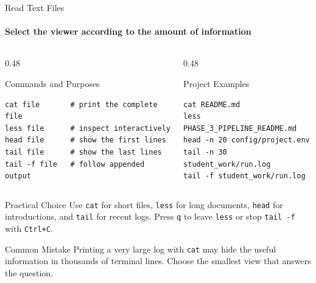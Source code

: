 \begin{frame}[fragile]{Read Text Files}
\framesubtitle{Select the viewer according to the amount of information}

\scriptsize

\begin{columns}[T,onlytextwidth]
    \begin{column}{0.48\textwidth}
        \begin{block}{Commands and Purposes}
\begin{verbatim}
cat file       # print the complete file
less file      # inspect interactively
head file      # show the first lines
tail file      # show the last lines
tail -f file   # follow appended output
\end{verbatim}
        \end{block}
    \end{column}

    \begin{column}{0.48\textwidth}
        \begin{exampleblock}{Project Examples}
\begin{verbatim}
cat README.md
less PHASE_3_PIPELINE_README.md
head -n 20 config/project.env
tail -n 30 student_work/run.log
tail -f student_work/run.log
\end{verbatim}
        \end{exampleblock}
    \end{column}
\end{columns}

\begin{block}{Practical Choice}
Use \texttt{cat} for short files, \texttt{less} for long documents,
\texttt{head} for introductions, and \texttt{tail} for recent logs.
Press \texttt{q} to leave \texttt{less} or stop \texttt{tail -f} with
\texttt{Ctrl+C}.
\end{block}

\begin{alertblock}{Common Mistake}
Printing a very large log with \texttt{cat} may hide the useful information in
thousands of terminal lines. Choose the smallest view that answers the question.
\end{alertblock}
\end{frame}

